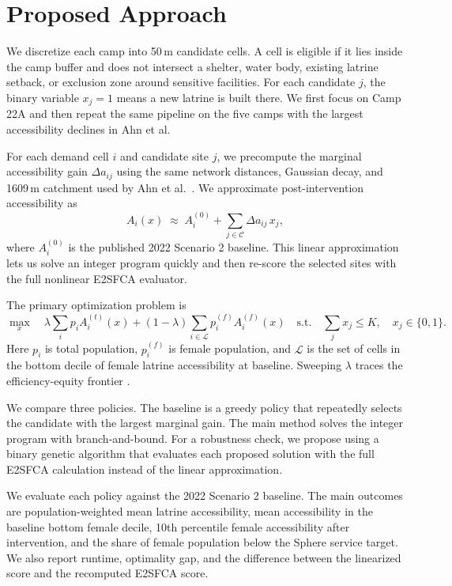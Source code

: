 \documentclass[twoside,11pt]{article}
\begin{document}
\section{Proposed Approach}

We discretize each camp into 50\,m candidate cells. A cell is eligible if it lies inside the camp buffer and does not intersect a shelter, water body, existing latrine setback, or exclusion zone around sensitive facilities. For each candidate $j$, the binary variable $x_j=1$ means a new latrine is built there. We first focus on Camp 22A and then repeat the same pipeline on the five camps with the largest accessibility declines in Ahn et al.

For each demand cell $i$ and candidate site $j$, we precompute the marginal accessibility gain $\Delta a_{ij}$ using the same network distances, Gaussian decay, and 1609\,m catchment used by Ahn et al.\ \cite{arxiv}. We approximate post-intervention accessibility as
\begin{equation}
A_i(x) \;\approx\; A_i^{(0)} + \sum_{j \in \mathcal{C}} \Delta a_{ij}\, x_j,
\end{equation}
where $A_i^{(0)}$ is the published 2022 Scenario 2 baseline. This linear approximation lets us solve an integer program quickly and then re-score the selected sites with the full nonlinear E2SFCA evaluator.

The primary optimization problem is
\begin{equation}
\max_x \quad
\lambda \sum_i p_i A_i^{(t)}(x)
+ (1-\lambda)\sum_{i \in \mathcal{L}} p_i^{(f)} A_i^{(f)}(x)
\quad
\text{s.t.}\quad
\sum_j x_j \le K,\quad x_j \in \{0,1\}.
\end{equation}
Here $p_i$ is total population, $p_i^{(f)}$ is female population, and $\mathcal{L}$ is the set of cells in the bottom decile of female latrine accessibility at baseline. Sweeping $\lambda$ traces the efficiency-equity frontier \cite{Kochenderfer2019-iw}.

We compare three policies. The baseline is a greedy policy that repeatedly selects the candidate with the largest marginal gain. The main method solves the integer program with branch-and-bound. For a robustness check, we propose using a binary genetic algorithm that evaluates each proposed solution with the full E2SFCA calculation instead of the linear approximation.

We evaluate each policy against the 2022 Scenario 2 baseline. The main outcomes are population-weighted mean latrine accessibility, mean accessibility in the baseline bottom female decile, 10th percentile female accessibility after intervention, and the share of female population below the Sphere service target. We also report runtime, optimality gap, and the difference between the linearized score and the recomputed E2SFCA score.




\end{document}
